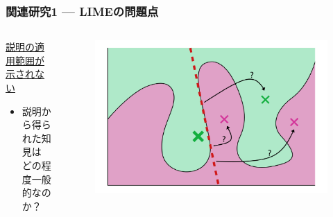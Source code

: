 \documentclass[aspectratio=169]{slide-ja}
\begin{document}
\begin{frame}
  \frametitle{関連研究1 — LIMEの問題点}
  \begin{columns}[]
    \begin{column}{0.4\textwidth}
      \underline{説明の適用範囲が示されない}

      \bigskip
      \begin{itemize}
        \item 説明から得られた知見は\\どの程度一般的なのか？
      \end{itemize}
    \end{column}
    \begin{column}{0.45\textwidth}
      \begin{figure}
        \includegraphics[width=\textwidth]{src/lime_drawback}
      \end{figure}
    \end{column}
  \end{columns}
\end{frame}
\end{document}
